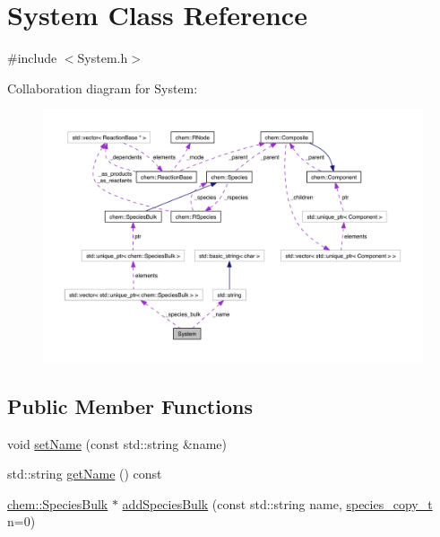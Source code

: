 \hypertarget{classSystem}{\section{System Class Reference}
\label{classSystem}
}


{\ttfamily \#include $<$System.\-h$>$}



Collaboration diagram for System\-:\nopagebreak
\begin{figure}[H]
\begin{center}
\leavevmode
\includegraphics[width=350pt]{classSystem__coll__graph}
\end{center}
\end{figure}
\subsection*{Public Member Functions}
\begin{DoxyCompactItemize}
\item 
void \hyperlink{classSystem_a6f4360b4a491316bc77e6c310cdf6512}{set\-Name} (const std\-::string \&name)
\item 
std\-::string \hyperlink{classSystem_a774d78ae771d47f38d09c288298f936a}{get\-Name} () const 
\item 
\hyperlink{classchem_1_1SpeciesBulk}{chem\-::\-Species\-Bulk} $\ast$ \hyperlink{classSystem_a141acd0fd533f36a1ae9e12b6b8ecda7}{add\-Species\-Bulk} (const std\-::string name, \hyperlink{common_8h_a3503f321fd36304ee274141275cca586}{species\-\_\-copy\-\_\-t} n=0)
\end{DoxyCompactItemize}
